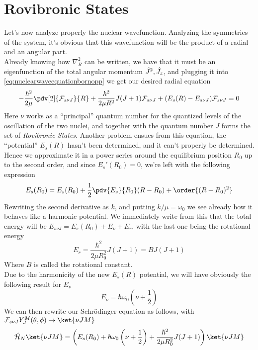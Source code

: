 \documentclass[../qm.tex]{subfiles}
\begin{document}
	\section{Rovibronic States}
	Let's now analyze properly the nuclear wavefunction. Analyzing the symmetries of the system, it's obvious that this wavefunction will be the product of a radial and an angular part.\\
	Already knowing how $\nabla_R^2$ can be written, we have that it must be an eigenfunction of the total angular momentum $\hat{J}^2,\hat{J}_z$, and plugging it into \eqref{eq:nuclearwaveequationbornopp} we get our desired radial equation
	\begin{equation}
		-\frac{\hbar^2}{2\mu}\pdv[2]{\mc{F}_{s\nu J}}{R}+\frac{\hbar^2}{2\mu R^2}J(J+1)\mc{F}_{s\nu J}+(E_s(R)-E_{s\nu J})\mc{F}_{s\nu J}=0
		\label{eq:nucradeqbo}
	\end{equation}
	Here $\nu$ works as a ``principal'' quantum number for the quantized levels of the oscillation of the two nuclei, and together with the quantum number $J$ forms the set of \textit{Rovibronic States}. Another problem ensues from this equation, the ``potential'' $E_s(R)$ hasn't been determined, and it can't properly be determined. Hence we approximate it in a power series around the equilibrium position $R_0$ up to the second order, and since $E_s'(R_0)=0$, we're left with the following expression
	\begin{equation}
		E_s(R_0)=E_s(R_0)+\frac{1}{2}\pdv{E_s}{R_0}(R-R_0)+\order{(R-R_0)^2}
		\label{eq:espowerseriesbo}
	\end{equation}
	Rewriting the second derivative as $k$, and putting $k/\mu=\omega_0$ we see already how it behaves like a harmonic potential. We immediately write from this that the total energy will be $E_{s\nu J}=E_s(R_0)+E_{\nu}+E_r$, with the last one being the rotational energy
	\begin{equation*}
		E_r=\frac{\hbar^2}{2\mu R_0^2}J(J+1)=BJ(J+1)
	\end{equation*}
	Where $B$ is called the rotational constant.\\
	Due to the harmonicity of the new $E_s(R)$ potential, we will have obviously the following result for $E_{\nu}$
	\begin{equation*}
		E_{\nu}=\hbar\omega_0\left( \nu+\frac{1}{2} \right)
	\end{equation*}
	We can then rewrite our Schrödinger equation as follows, with $\mc{F}_{s\nu J}Y^M_J(\theta,\phi)\to\ket{\nu JM}$
	\begin{equation}
		\opr{\ham}_N\ket{\nu JM}=\left( E_s(R_0)+\hbar\omega_0\left( \nu+\frac{1}{2} \right)+\frac{\hbar^2}{2\mu R_0^2}J(J+1) \right)\ket{\nu JM}
		\label{eq:newnucschrbo}
	\end{equation}
\end{document}
